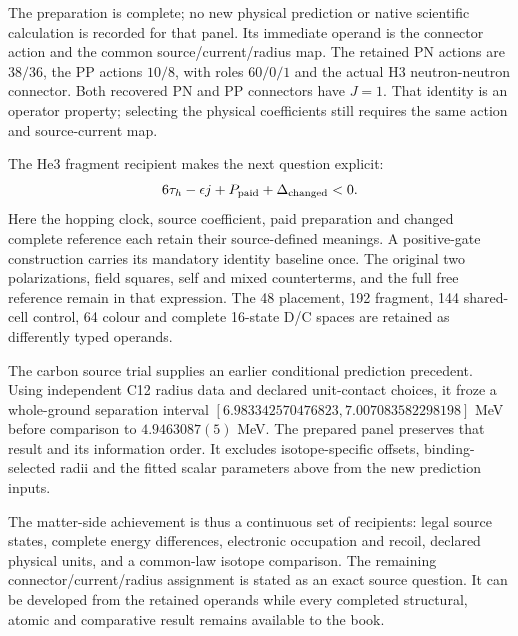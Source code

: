 The preparation is complete; no new physical prediction or native scientific calculation is recorded for that panel. Its immediate operand is the connector action and the common source/current/radius map. The retained PN actions are $38/36$, the PP actions $10/8$, with roles $60/0/1$ and the actual H3 neutron-neutron connector. Both recovered PN and PP connectors have $J=1$. That identity is an operator property; selecting the physical coefficients still requires the same action and source-current map.

The He3 fragment recipient makes the next question explicit:
\begin{equation}
6\tau_h-\epsilon j+P_{\rm paid}+\Delta_{\rm changed}<0.
\end{equation}
Here the hopping clock, source coefficient, paid preparation and changed complete reference each retain their source-defined meanings. A positive-gate construction carries its mandatory identity baseline once. The original two polarizations, field squares, self and mixed counterterms, and the full free reference remain in that expression. The 48 placement, 192 fragment, 144 shared-cell control, 64 colour and complete 16-state D/C spaces are retained as differently typed operands.

The carbon source trial supplies an earlier conditional prediction precedent. Using independent C12 radius data and declared unit-contact choices, it froze a whole-ground separation interval $[6.983342570476823,7.007083582298198]$ MeV before comparison to $4.9463087(5)$ MeV. The prepared panel preserves that result and its information order. It excludes isotope-specific offsets, binding-selected radii and the fitted scalar parameters above from the new prediction inputs.

The matter-side achievement is thus a continuous set of recipients: legal source states, complete energy differences, electronic occupation and recoil, declared physical units, and a common-law isotope comparison. The remaining connector/current/radius assignment is stated as an exact source question. It can be developed from the retained operands while every completed structural, atomic and comparative result remains available to the book.
